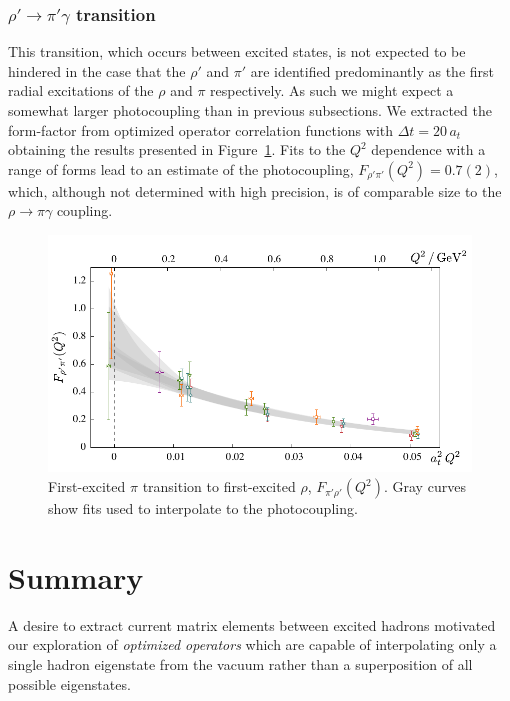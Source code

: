 \documentclass[twocolumn,amsmath,amssymb,prd,10pt,floatfix, 
superscriptaddress,nofootinbib, showpacs, preprintnumbers]{revtex4-1}
\begin{document}
\subsubsection{$\rho' \rightarrow \pi' \gamma$ transition}


This transition, which occurs between excited states, is not expected to be hindered in the case that the $\rho'$ and $\pi'$ are identified predominantly as the first radial excitations of the $\rho$ and $\pi$ respectively. As such we might expect a somewhat larger photocoupling than in previous subsections. We extracted the form-factor from optimized operator correlation functions with $\Delta t = 20 \,a_t$ obtaining the results presented in Figure~\ref{fig::rho1_pi1_transition}. Fits to the $Q^2$ dependence with a range of forms lead to an estimate of the photocoupling, $F_{\rho' \pi'}(Q^2) = 0.7(2)$, which, although not determined with high precision, is of comparable size to the $\rho \to \pi \gamma$ coupling. 

\begin{figure}
  \includegraphics[width=0.7 \linewidth]{fig22.pdf}
      \caption{First-excited $\pi$ transition to first-excited $\rho$, $F_{\pi' \rho'}(Q^2)$. Gray curves show fits used to interpolate to the photocoupling. \label{fig::rho1_pi1_transition}}
\end{figure}



%
\section{Summary \label{sec::summary}}

A desire to extract current matrix elements between excited hadrons motivated our exploration of \emph{optimized operators} which are capable of interpolating only a single hadron eigenstate from the vacuum rather than a superposition of all possible eigenstates.
\end{document}
